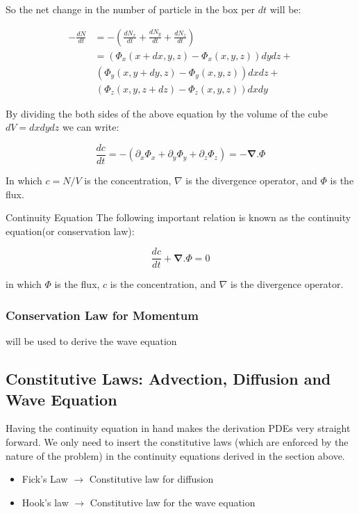 So the net change in the number of particle in the box per $dt$ will be:

\begin{align*}
	-\frac{dN}{dt} &= - (\frac{dN_x}{dt} + \frac{dN_y}{dt} + \frac{dN_z}{dt}) \\
	&= (\Phi_x(x+dx,y,z)-\Phi_x(x,y,z))dydz + \\
	&\, (\Phi_y(x,y+dy,z)-\Phi_y(x,y,z)) dx dz + \\
	&\, (\Phi_z(x,y,z+dz) - \Phi_z(x,y,z)) dx dy
\end{align*}


By dividing the both sides of the above equation by the volume of the cube $ dV = dx dy dz $ we can write:

\begin{equation*}
	\frac{dc}{dt} = - (\partial_{x}\Phi_x + \partial_{y}\Phi_y + \partial_{z}\Phi_z) = -\mathbf{\nabla} . \Phi
\end{equation*}

In which $c = N/V$ is the concentration, $ \nabla $ is the divergence operator, and $ \Phi $ is the flux. 

\begin{defbox}{Continuity Equation}
	The following important relation is known as the continuity equation(or conservation law):
	
	\begin{equation}
			\frac{dc}{dt} + \mathbf{\nabla} . \Phi = 0
	\end{equation}

	in which $\Phi$ is the flux, $c$ is the concentration, and $ \nabla $ is the divergence operator.
\end{defbox}


\subsubsection{Conservation Law for Momentum}
will be used to derive the wave equation


\subsection{Constitutive Laws: Advection, Diffusion and Wave Equation}

Having the continuity equation in hand makes the derivation PDEs very straight forward. We only need to insert the constitutive laws (which are enforced by the nature of the problem) in the continuity equations derived in the section above.


\begin{itemize}
	\item Fick's Law $\rightarrow$ Constitutive law for diffusion 
	\item Hook's law $\rightarrow$ Constitutive law for the wave equation
\end{itemize}



